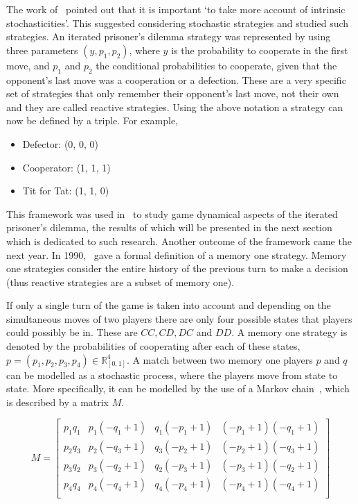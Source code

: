 \documentclass{article}
\theoremstyle{definition}
\begin{document}
The work of~\cite{May1987} pointed out that it is important `to take more account of intrinsic
stochasticities'. This suggested considering stochastic strategies and
\cite{nowak1989} studied such strategies. An iterated prisoner's dilemma strategy
was represented by using three parameters \((y, p_1, p_2)\), where \(y\) is the
probability to cooperate in the first move, and \(p_1\) and \(p_2\) the conditional probabilities
to cooperate, given that the opponent's last move was a cooperation or a defection.
These are a very specific set of strategies that only remember their
opponent's last move, not their own and they are called reactive strategies.
Using the above notation a strategy can now be defined by a triple. For example,

\begin{itemize}
    \item Defector: (0, 0, 0)
    \item Cooperator: (1, 1, 1)
    \item Tit for Tat: (1, 1, 0)
\end{itemize}

This framework was used in~\cite{nowak1989} to study game dynamical aspects of the
iterated prisoner's dilemma, the results of which will be presented in the next section
which is dedicated to such research. Another outcome of the framework came
the next year. In 1990,~\cite{Nowak1990} gave a formal definition of a memory one strategy.
Memory one strategies consider the entire history of the previous turn to make a
decision (thus reactive strategies are a subset of memory one).

If only a single turn of the game is taken into account and depending on the
simultaneous moves of two players there are only four possible states that
players could possibly be in. These are \(CC, CD, DC\) and \(DD\). A memory one
strategy is denoted by the probabilities of cooperating after each of these states,
\( p = (p_1, p_2, p_3, p_4) \in\mathbb{R}_{[0,1]}^{4} \).
A match between two memory one players \(p\) and \(q\) can be modelled as a
stochastic process, where the players move from state to state. More specifically,
it can be modelled by the use of a Markov chain~\cite{gamerman2006markov},
which is described by a matrix \(M\).

\begin{equation}\label{eq:markov_matrix}
    M =
\begin{bmatrix}
    p_{1} q_{1} & p_{1} (- q_{1} + 1) & q_{1} (- p_{1} + 1) & (- p_{1} + 1) (- q_{1} + 1)
    \\
    p_{2} q_{3} & p_{2} (- q_{3} + 1) & q_{3} (- p_{2} + 1) & (- p_{2} + 1) (- q_{3} + 1)
    \\
    p_{3} q_{2} & p_{3} (- q_{2} + 1) & q_{2} (- p_{3} + 1) & (- p_{3} + 1) (- q_{2} + 1)
    \\
    p_{4} q_{4} & p_{4} (- q_{4} + 1) & q_{4} (- p_{4} + 1) & (- p_{4} + 1) (- q_{4} + 1)
    \\
\end{bmatrix}
\end{equation}
\end{document}
